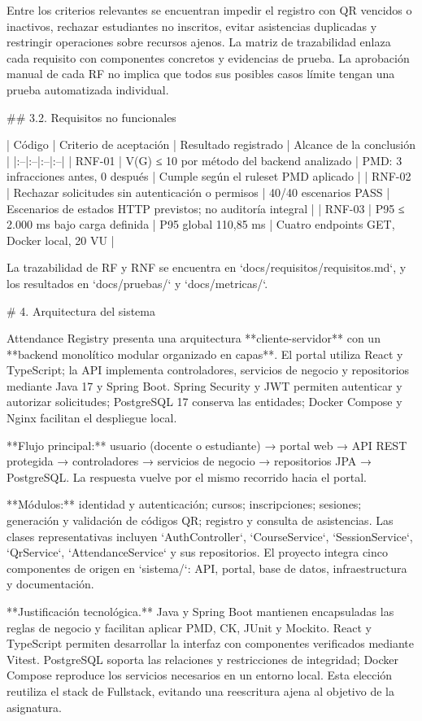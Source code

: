 Entre los criterios relevantes se encuentran impedir el registro con QR vencidos o inactivos, rechazar estudiantes no inscritos, evitar asistencias duplicadas y restringir operaciones sobre recursos ajenos. La matriz de trazabilidad enlaza cada requisito con componentes concretos y evidencias de prueba. La aprobación manual de cada RF no implica que todos sus posibles casos límite tengan una prueba automatizada individual.

## 3.2. Requisitos no funcionales

| Código | Criterio de aceptación | Resultado registrado | Alcance de la conclusión |
|:--|:--|:--|:--|
| RNF-01 | V(G) ≤ 10 por método del backend analizado | PMD: 3 infracciones antes, 0 después | Cumple según el ruleset PMD aplicado |
| RNF-02 | Rechazar solicitudes sin autenticación o permisos | 40/40 escenarios PASS | Escenarios de estados HTTP previstos; no auditoría integral |
| RNF-03 | P95 ≤ 2.000 ms bajo carga definida | P95 global 110,85 ms | Cuatro endpoints GET, Docker local, 20 VU |

La trazabilidad de RF y RNF se encuentra en `docs/requisitos/requisitos.md`, y los resultados en `docs/pruebas/` y `docs/metricas/`.

# 4. Arquitectura del sistema

Attendance Registry presenta una arquitectura **cliente-servidor** con un **backend monolítico modular organizado en capas**. El portal utiliza React y TypeScript; la API implementa controladores, servicios de negocio y repositorios mediante Java 17 y Spring Boot. Spring Security y JWT permiten autenticar y autorizar solicitudes; PostgreSQL 17 conserva las entidades; Docker Compose y Nginx facilitan el despliegue local.

**Flujo principal:** usuario (docente o estudiante) → portal web → API REST protegida → controladores → servicios de negocio → repositorios JPA → PostgreSQL. La respuesta vuelve por el mismo recorrido hacia el portal.

**Módulos:** identidad y autenticación; cursos; inscripciones; sesiones; generación y validación de códigos QR; registro y consulta de asistencias. Las clases representativas incluyen `AuthController`, `CourseService`, `SessionService`, `QrService`, `AttendanceService` y sus repositorios. El proyecto integra cinco componentes de origen en `sistema/`: API, portal, base de datos, infraestructura y documentación.

**Justificación tecnológica.** Java y Spring Boot mantienen encapsuladas las reglas de negocio y facilitan aplicar PMD, CK, JUnit y Mockito. React y TypeScript permiten desarrollar la interfaz con componentes verificados mediante Vitest. PostgreSQL soporta las relaciones y restricciones de integridad; Docker Compose reproduce los servicios necesarios en un entorno local. Esta elección reutiliza el stack de Fullstack, evitando una reescritura ajena al objetivo de la asignatura.

